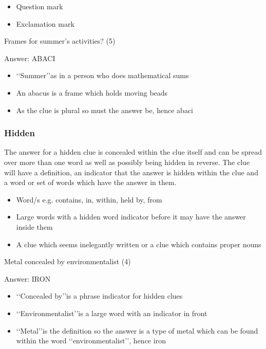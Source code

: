 \begin{itemize} 
	\item Question mark 
	\item Exclamation mark
\end{itemize} 


Frames for summer's activities? (5) 

Answer: ABACI 

\begin{itemize}
	\item \lq\lq Summer\rq\rq as in a person who does mathematical sums 
	\item An abacus is a frame which holds moving beads 
	\item As the clue is plural so must the answer be, hence abaci
\end{itemize}

\subsubsection{Hidden} 
The answer for a hidden clue is concealed within the clue itself and can be spread over more than one word as well as possibly being hidden in reverse. The clue will have a definition, an indicator that the answer is hidden within the clue and a word or set of words which have the answer in them.  

\begin{itemize} 
	\item Word/s e.g. contains, in, within, held by, from 
	\item Large words with a hidden word indicator before it may have the answer inside them 
	\item A clue which seems inelegantly written or a clue which contains proper nouns  
\end{itemize}


Metal concealed by environmentalist (4) 

Answer: IRON 

\begin{itemize}
	\item \lq\lq Concealed by\rq\rq is a phrase indicator for hidden clues 
	\item \lq\lq Environmentalist\rq\rq is a large word with an indicator in front 
	\item \lq\lq Metal\rq\rq is the definition so the answer is a type of metal which can be found within the word \lq\lq environmentalist\rq\rq, hence iron 
\end{itemize}

